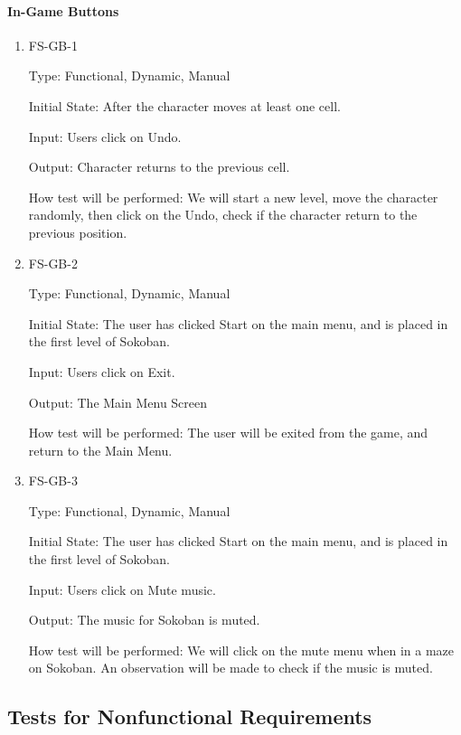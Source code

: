 \documentclass[12pt, titlepage]{article}
\begin{document}
\paragraph{In-Game Buttons}

\begin{enumerate}

\item{FS-GB-1\\}

Type: Functional, Dynamic, Manual
					
Initial State: After the character moves at least one cell.
					
Input: Users click on Undo.
					
Output: Character returns to the previous cell.
					
How test will be performed: We will start a new level, move the character randomly, then click on the Undo, check if the character return to the previous position.

\item{FS-GB-2\\}

Type: Functional, Dynamic, Manual
					
Initial State: The user has clicked Start on the main menu, and is placed in the first level of Sokoban.
					
Input: Users click on Exit.
					
Output: The Main Menu Screen
					
How test will be performed: The user will be exited from the game, and return to the Main Menu.

\item{FS-GB-3\\}

Type: Functional, Dynamic, Manual
					
Initial State: The user has clicked Start on the main menu, and is placed in the first level of Sokoban.
					
Input: Users click on Mute music.
					
Output: The music for Sokoban is muted.
					
How test will be performed: We will click on the mute menu when in a maze on Sokoban. An observation will be made to check if the music is muted.

\end{enumerate}
\subsection{Tests for Nonfunctional Requirements}
\end{document}
